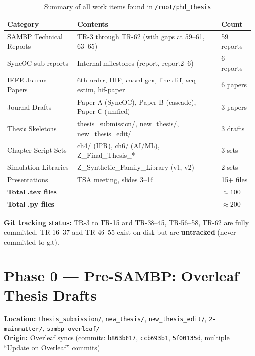 \documentclass[11pt,a4paper]{article}
\begin{document}
\begin{table}[h!]
\centering
\caption{Summary of all work items found in \texttt{/root/phd\_thesis}}
\begin{tabularx}{\textwidth}{lXl}
\toprule
\textbf{Category} & \textbf{Contents} & \textbf{Count} \\
\midrule
SAMBP Technical Reports & TR-3 through TR-62 (with gaps at 59–61, 63–65) & 59 reports \\
SyncOC sub-reports & Internal milestones (report, report2--6) & 6 reports \\
IEEE Journal Papers & 6th-order, HIF, coord-gen, line-diff, seq-estim, hif-paper & 6 papers \\
Journal Drafts & Paper A (SyncOC), Paper B (cascade), Paper C (unified) & 3 papers \\
Thesis Skeletons & thesis\_submission/, new\_thesis/, new\_thesis\_edit/ & 3 drafts \\
Chapter Script Sets & ch4/ (IPR), ch6/ (AI/ML), Z\_Final\_Thesis\_* & 3 sets \\
Simulation Libraries & Z\_Synthetic\_Family\_Library (v1, v2) & 2 sets \\
Presentations & TSA meeting, slides 3--16 & 15+ files \\
\midrule
\textbf{Total .tex files} & & $\approx 100$ \\
\textbf{Total .py files} & & $\approx 200$ \\
\bottomrule
\end{tabularx}
\end{table}

\textbf{Git tracking status:} TR-3 to TR-15 and TR-38--45, TR-56--58, TR-62 are
fully committed. TR-16--37 and TR-46--55 exist on disk but are
\textcolor{untrackedorange}{\textbf{untracked}} (never committed to git).

\newpage
\section{Phase 0 — Pre-SAMBP: Overleaf Thesis Drafts}

\begin{phasebox}
\textbf{Location:} \texttt{thesis\_submission/}, \texttt{new\_thesis/},
\texttt{new\_thesis\_edit/}, \texttt{2-mainmatter/}, \texttt{sambp\_overleaf/}\\
\textbf{Origin:} Overleaf syncs (commits: \texttt{b863b017}, \texttt{ccb693b1},
\texttt{5f00135d}, multiple ``Update on Overleaf'' commits)
\end{phasebox}
\end{document}
